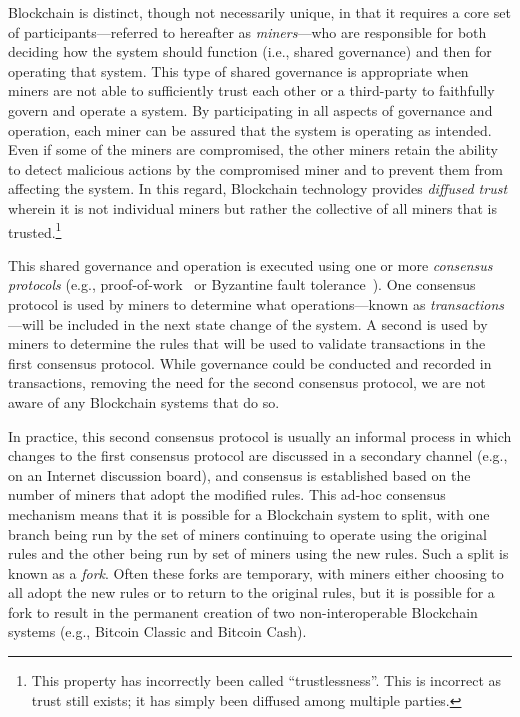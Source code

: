Blockchain is distinct, though not necessarily unique, in that it requires a core set of participants---referred to hereafter as \emph{miners}---who are responsible for both deciding how the system should function (i.e., shared governance) and then for operating that system.
This type of shared governance is appropriate when miners are not able to sufficiently trust each other or a third-party to faithfully govern and operate a system.
By participating in all aspects of governance and operation, each miner can be assured that the system is operating as intended.
Even if some of the miners are compromised, the other miners retain the ability to detect malicious actions by the compromised miner and to prevent them from affecting the system.
In this regard, Blockchain technology provides \emph{diffused trust} wherein it is not individual miners but rather the collective of all miners that is trusted.\footnote{This property has incorrectly been called ``trustlessness''. This is incorrect as trust still exists; it has simply been diffused among multiple parties.} 

This shared governance and operation is executed using one or more \emph{consensus protocols} (e.g., proof-of-work~\cite{DN93,back1997partial,NakamotoS8} or Byzantine fault tolerance~\cite{castro1999practical}).
One consensus protocol is used by miners to determine what operations---known as \emph{transactions}---will be included in the next state change of the system.
A second is used by miners to determine the rules that will be used to validate transactions in the first consensus protocol.
While governance could be conducted and recorded in transactions, removing the need for the second consensus protocol, we are not aware of any Blockchain systems that do so.

In practice, this second consensus protocol is usually an informal process in which changes to the first consensus protocol are discussed in a secondary channel (e.g., on an Internet discussion board), and consensus is established based on the number of miners that adopt the modified rules.
This ad-hoc consensus mechanism means that it is possible for a Blockchain system to split, with one branch being run by the set of miners continuing to operate using the original rules and the other being run by set of miners using the new rules.
Such a split is known as a \emph{fork}.
Often these forks are temporary, with miners either choosing to all adopt the new rules or to return to the original rules, but it is possible for a fork to result in the permanent creation of two non-interoperable Blockchain systems (e.g., Bitcoin Classic and Bitcoin Cash).


